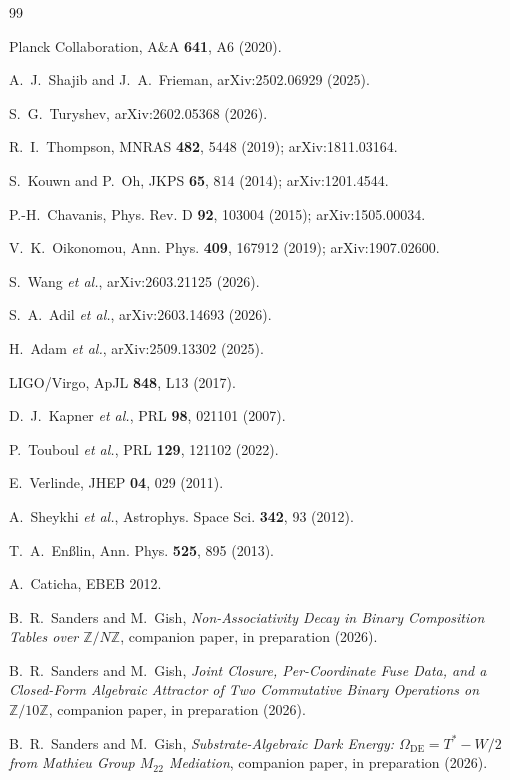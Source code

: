 \documentclass[11pt,reqno]{amsart}
\theoremstyle{plain}
\theoremstyle{definition}
\theoremstyle{remark}
\newcommand{\DE}{\mathrm{DE}}
\begin{document}
\begin{thebibliography}{99}

Planck Collaboration, A\&A \textbf{641}, A6 (2020).


A.~J.~Shajib and J.~A.~Frieman, arXiv:2502.06929 (2025).

S.~G.~Turyshev, arXiv:2602.05368 (2026).


R.~I.~Thompson, MNRAS \textbf{482}, 5448 (2019); arXiv:1811.03164.

S.~Kouwn and P.~Oh, JKPS \textbf{65}, 814 (2014); arXiv:1201.4544.

P.-H.~Chavanis, Phys. Rev. D \textbf{92}, 103004 (2015); arXiv:1505.00034.

V.~K.~Oikonomou, Ann. Phys. \textbf{409}, 167912 (2019); arXiv:1907.02600.

S.~Wang \emph{et al.}, arXiv:2603.21125 (2026).

S.~A.~Adil \emph{et al.}, arXiv:2603.14693 (2026).

H.~Adam \emph{et al.}, arXiv:2509.13302 (2025).


LIGO/Virgo, ApJL \textbf{848}, L13 (2017).

D.~J.~Kapner \emph{et al.}, PRL \textbf{98}, 021101 (2007).

P.~Touboul \emph{et al.}, PRL \textbf{129}, 121102 (2022).


E.~Verlinde, JHEP \textbf{04}, 029 (2011).

A.~Sheykhi \emph{et al.}, Astrophys. Space Sci. \textbf{342}, 93 (2012).

T.~A.~En{\ss}lin, Ann. Phys. \textbf{525}, 895 (2013).

A.~Caticha, EBEB 2012.


B.~R.~Sanders and M.~Gish,
\emph{Non-Associativity Decay in Binary Composition Tables over $\mathbb{Z}/N\mathbb{Z}$},
companion paper, in preparation (2026).

B.~R.~Sanders and M.~Gish,
\emph{Joint Closure, Per-Coordinate Fuse Data, and a Closed-Form
Algebraic Attractor of Two Commutative Binary Operations on
$\mathbb{Z}/10\mathbb{Z}$},
companion paper, in preparation (2026).

B.~R.~Sanders and M.~Gish,
\emph{Substrate-Algebraic Dark Energy: $\Omega_\DE = T^* - W/2$ from
Mathieu Group $M_{22}$ Mediation},
companion paper, in preparation (2026).

\end{thebibliography}
\end{document}
